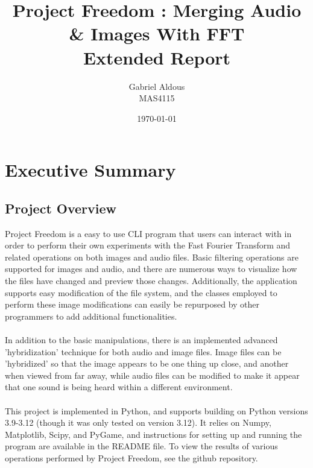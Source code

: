 \documentclass[notitlepage]{article}
\begin{document}

\title{Project Freedom : Merging Audio \& Images With FFT\\Extended Report}
\author{Gabriel Aldous\\MAS4115}
\date{\isodate\today}

\maketitle

\tableofcontents

\newpage
\section{Executive Summary}

\subsection{Project Overview}

Project Freedom is a easy to use CLI program that
users can interact with in order to perform their own experiments
with the Fast Fourier Transform and related operations on both images and audio files.
Basic filtering operations are supported for images and audio, and
there are numerous ways to visualize how the files have changed
and preview those changes. Additionally, the application supports
easy modification of the file system, and the classes employed
to perform these image modifications can easily be repurposed by
other programmers to add additional functionalities.
\\\\
In addition to the basic manipulations, there is an implemented
advanced 'hybridization' technique for both audio and image files.
Image files can be 'hybridized' so that the image appears to be one
thing up close, and another when viewed from far away, while audio
files can be modified to make it appear that one sound is being heard
within a different environment.
\\\\
This project is implemented in Python, and supports building on
Python versions 3.9-3.12 (though it was only tested on version 3.12).
It relies on Numpy, Matplotlib, Scipy, and PyGame, and instructions for
setting up and running the program are available in the README file.
To view the results of various operations performed by Project Freedom,
see the github repository.
\\\\
\end{document}
